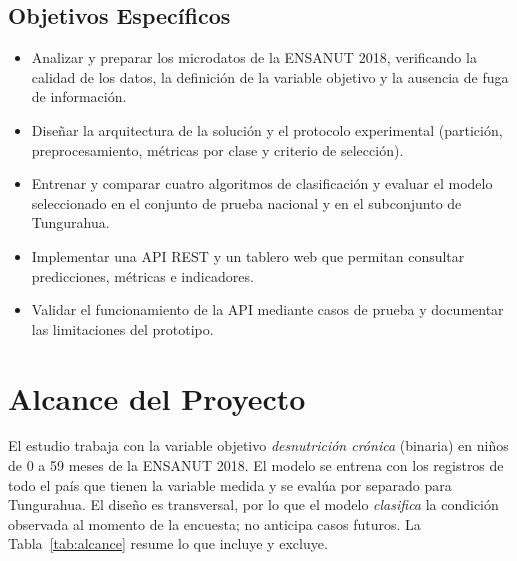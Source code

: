 \subsection{Objetivos Específicos}
\begin{itemize}
  \item Analizar y preparar los microdatos de la ENSANUT 2018, verificando la calidad de los datos, la definición de la variable objetivo y la ausencia de fuga de información.
  \item Diseñar la arquitectura de la solución y el protocolo experimental (partición, preprocesamiento, métricas por clase y criterio de selección).
  \item Entrenar y comparar cuatro algoritmos de clasificación y evaluar el modelo seleccionado en el conjunto de prueba nacional y en el subconjunto de Tungurahua.
  \item Implementar una API REST y un tablero web que permitan consultar predicciones, métricas e indicadores.
  \item Validar el funcionamiento de la API mediante casos de prueba y documentar las limitaciones del prototipo.
\end{itemize}

\section{Alcance del Proyecto}
El estudio trabaja con la variable objetivo \textit{desnutrición crónica} (binaria) en niños de 0 a 59 meses de la ENSANUT 2018. El modelo se entrena con los registros de todo el país que tienen la variable medida y se evalúa por separado para Tungurahua. El diseño es transversal, por lo que el modelo \emph{clasifica} la condición observada al momento de la encuesta; no anticipa casos futuros. La Tabla~\ref{tab:alcance} resume lo que incluye y excluye.

